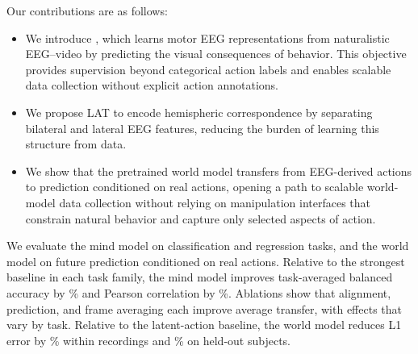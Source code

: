 Our contributions are as follows:
\begin{itemize}
    \item We introduce \mwm{}, which learns motor EEG representations from naturalistic EEG--video by predicting the visual consequences of behavior. This objective provides supervision beyond categorical action labels and enables scalable data collection without explicit action annotations.
    \item We propose LAT to encode hemispheric correspondence by separating bilateral and lateral EEG features, reducing the burden of learning this structure from data.
    \item We show that the pretrained world model transfers from EEG-derived actions to prediction conditioned on real actions, opening a path to scalable world-model data collection without relying on manipulation interfaces that constrain natural behavior and capture only selected aspects of action.
\end{itemize}

We evaluate the mind model on \mwmClsTasks{} classification and \mwmRegTasks{} regression tasks, and the world model on future prediction conditioned on real actions. Relative to the strongest baseline in each task family, the mind model improves task-averaged balanced accuracy by \mwmClsGainPct{}\% and Pearson correlation by \mwmRegGainPct{}\%. Ablations show that alignment, prediction, and frame averaging each improve average transfer, with effects that vary by task. Relative to the latent-action baseline, the world model reduces L1 error by \mwmWMWithinGainPct{}\% within recordings and \mwmWMSubjectGainPct{}\% on held-out subjects.
